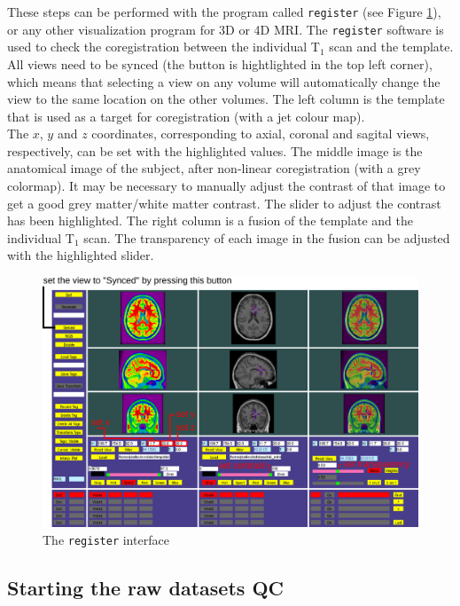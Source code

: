 \documentclass[12pt]{paper}%
\begin{document}
These steps can be performed with the program called \texttt{register} (see Figure \ref{fig_set_slices}), or any other visualization program for 3D or 4D MRI.
{ The \texttt{register} software is used to check the coregistration between the individual T$_1$ scan and the template.} {All views need to be synced (the button is hightlighted in the top left corner), which means that selecting a view on any volume will automatically change the view to the same location on the other volumes. The left column is the template that is used as a target for coregistration (with a jet colour map).\\

The $x$, $y$ and $z$ coordinates, corresponding to axial, coronal and sagital views, respectively, can be set with the highlighted values. The middle image is the anatomical image of the subject, after non-linear coregistration (with a grey colormap). It may be necessary to manually adjust the contrast of that image to get a good grey matter/white matter contrast. The slider to adjust the contrast has been highlighted. The right column is a fusion of the template and the individual T$_1$ scan. The transparency of each image in the fusion can be adjusted with the highlighted slider.}
\begin{figure}[htbp]
\begin{center}
\includegraphics[width=\linewidth]{fig_set_slices}
\caption{The \texttt{register} interface}
\label{fig_set_slices}
\end{center}

\end{figure}

\subsection{Starting the raw datasets QC}
\end{document}
